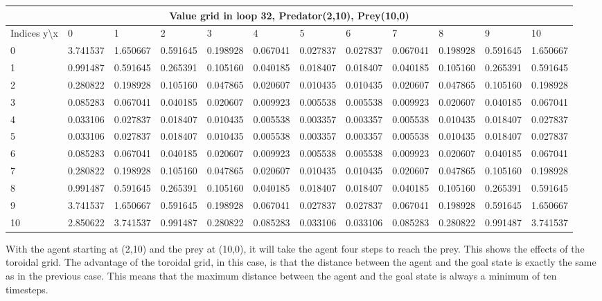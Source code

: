\documentclass{article}
\begin{document}
\begin{center}
\scalebox{0.7}
	{
	\begin{tabular}{ |l | l | l | l | l | l | l | l | l | l | l | l|}
	\hline
	\multicolumn{12}{|c|}{Value grid in loop 32, Predator(2,10), Prey(10,0)}\\
	\hline
	Indices y\textbackslash x &0 & 1 & 2 & 3 & 4 & 5 & 6 & 7 & 8 & 9 & 10 \\ 

\hline
0 & 3.741537 & 1.650667 & 0.591645 & 0.198928 & 0.067041 & 0.027837 & 0.027837 & 0.067041 & 0.198928 & 0.591645 & 1.650667 \\
1 & 0.991487 & 0.591645 & 0.265391 & 0.105160 & 0.040185 & 0.018407 & 0.018407 & 0.040185 & 0.105160 & 0.265391 & 0.591645 \\
2 & 0.280822 & 0.198928 & 0.105160 & 0.047865 & 0.020607 & 0.010435 & 0.010435 & 0.020607 & 0.047865 & 0.105160 & \cellcolor{green!40}0.198928 \\
3 & 0.085283 & 0.067041 & 0.040185 & 0.020607 & 0.009923 & 0.005538 & 0.005538 & 0.009923 & 0.020607 & 0.040185 & 0.067041 \\
4 & 0.033106 & 0.027837 & 0.018407 & 0.010435 & 0.005538 & 0.003357 & 0.003357 & 0.005538 & 0.010435 & 0.018407 & 0.027837 \\
5 & 0.033106 & 0.027837 & 0.018407 & 0.010435 & 0.005538 & 0.003357 & 0.003357 & 0.005538 & 0.010435 & 0.018407 & 0.027837 \\
6 & 0.085283 & 0.067041 & 0.040185 & 0.020607 & 0.009923 & 0.005538 & 0.005538 & 0.009923 & 0.020607 & 0.040185 & 0.067041 \\
7 & 0.280822 & 0.198928 & 0.105160 & 0.047865 & 0.020607 & 0.010435 & 0.010435 & 0.020607 & 0.047865 & 0.105160 & 0.198928 \\
8 & 0.991487 & 0.591645 & 0.265391 & 0.105160 & 0.040185 & 0.018407 & 0.018407 & 0.040185 & 0.105160 & 0.265391 & 0.591645 \\
9 & 3.741537 & 1.650667 & 0.591645 & 0.198928 & 0.067041 & 0.027837 & 0.027837 & 0.067041 & 0.198928 & 0.591645 & 1.650667 \\
10 & \cellcolor{red!40}2.850622 & 3.741537 & 0.991487 & 0.280822 & 0.085283 & 0.033106 & 0.033106 & 0.085283 & 0.280822 & 0.991487 & 3.741537 \\

\hline
	\end{tabular}
	}
\end{center}

With the agent starting at (2,10) and the prey at (10,0), it will take the agent four steps to reach the prey. This shows the effects of the toroidal grid. The advantage of the toroidal grid, in this case, is that the distance between the agent and the goal state is exactly the same as in the previous case. This means that the maximum distance between the agent and the goal state is always a minimum of ten timesteps.
\end{document}
